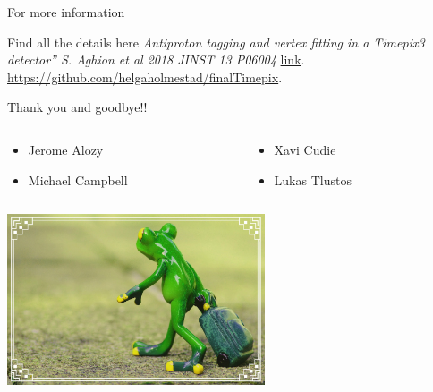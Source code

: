\documentclass{beamer}
\begin{document}
\begin{frame}{For more information}  
  \begin{block}{Find all the details here}
    \vspace{0.1cm}
  \emph{Antiproton tagging and vertex fitting in a Timepix3 detector”
S. Aghion et al 2018 JINST 13 P06004}
  \href{http://iopscience.iop.org/article/10.1088/1748-0221/13/06/P06004}{link}.\\
  \vspace{0.3cm}
  \href{https://github.com/helgaholmestad/finalTimepix}{https://github.com/helgaholmestad/finalTimepix}.
  \end{block}
  \end{frame}
\begin{frame}{Thank you and goodbye!!}
  \begin{block}{
      \begin{columns}
        \begin{column}{0.5\textwidth}
          \begin{itemize}
            \setlength{\itemindent}{1.4cm}
          \item{Jerome Alozy}
          \item{Michael Campbell}
          \end{itemize}
        \end{column}
        \begin{column}{0.5\textwidth}
          \begin{itemize}
          \item{Xavi Cudie}
          \item{Lukas Tlustos}
          \end{itemize}
        \end{column}
      \end{columns}
    }
    \centering
    \vspace{0.5cm}
       \includegraphics[width=3.00in]{fig/OnVacation.jpg}

\end{block}
\end{frame}
\end{document}
